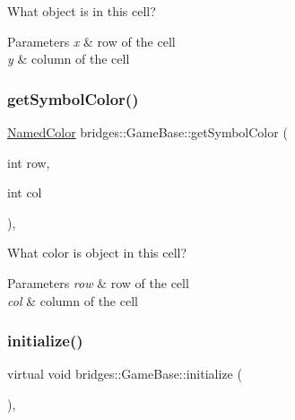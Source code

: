 What object is in this cell? 


\begin{DoxyParams}{Parameters}
{\em x} & row of the cell \\
\hline
{\em y} & column of the cell \\
\hline
\end{DoxyParams}
\mbox{\label{classbridges_1_1_game_base_a365f55e4004bd9b01b0dd1431bea9876}} 
\subsubsection{\texorpdfstring{get\+Symbol\+Color()}{getSymbolColor()}}
{\footnotesize\ttfamily \hyperlink{namespacebridges_ad811207d8898a7fd6b72a74725e68357}{Named\+Color} bridges\+::\+Game\+Base\+::get\+Symbol\+Color (\begin{DoxyParamCaption}\item[{int}]{row,  }\item[{int}]{col }\end{DoxyParamCaption})\hspace{0.3cm}{\ttfamily [inline]}, {\ttfamily [protected]}}



What color is object in this cell? 


\begin{DoxyParams}{Parameters}
{\em row} & row of the cell \\
\hline
{\em col} & column of the cell \\
\hline
\end{DoxyParams}
\mbox{\label{classbridges_1_1_game_base_ae19dd2b80fdda7736f5ab22ff89a0873}} 
\subsubsection{\texorpdfstring{initialize()}{initialize()}}
{\footnotesize\ttfamily virtual void bridges\+::\+Game\+Base\+::initialize (\begin{DoxyParamCaption}{ }\end{DoxyParamCaption})\hspace{0.3cm}{\ttfamily [protected]}, {}}



